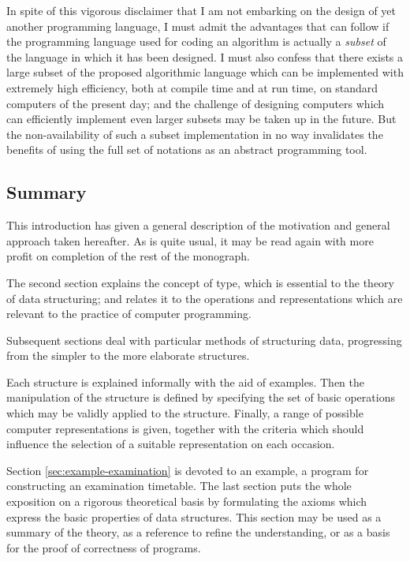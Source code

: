 \documentclass[twoside,11pt]{book}
\begin{document}
In spite of this vigorous disclaimer that I am not embarking on the design of yet another programming language, I must admit the advantages that can follow if the programming language used for coding an algorithm is actually a \textit{subset} of the language in which it has been designed. I must also confess that there exists a large subset of the proposed algorithmic language which can be implemented with extremely high efficiency, both at compile time and at run time, on standard computers of the present day; and the challenge of designing computers which can efficiently implement even larger subsets may be taken up in the future. But the non-availability of such a subset implementation in no way invalidates the benefits of using the full set of notations as an abstract programming tool.

\subsection{Summary}

This introduction has given a general description of the motivation and general approach taken hereafter. As is quite usual, it may be read again with more profit on completion of the rest of the monograph.

The second section explains the concept of type, which is essential to the theory of data structuring; and relates it to the operations and representations which are relevant to the practice of computer programming.

Subsequent sections deal with particular methods of structuring data, progressing from the simpler to the more elaborate structures.

Each structure is explained informally with the aid of examples. Then the manipulation of the structure is defined by specifying the set of basic operations which may be validly applied to the structure. Finally, a range of possible computer representations is given, together with the criteria which should influence the selection of a suitable representation on each occasion.

Section \ref{sec:example-examination} is devoted to an example, a program for constructing an examination timetable. The last section puts the whole exposition on a rigorous theoretical basis by formulating the axioms which express the basic properties of data structures. This section may be used as a summary of the theory, as a reference to refine the understanding, or as a basis for the proof of correctness of programs.
\end{document}
